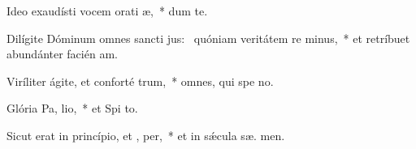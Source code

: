 \item Ideo exaudísti vocem orati æ,~* dum   te.
\item Dilígite Dóminum omnes sancti jus:~\pscross{} quóniam veritátem re minus,~* et retríbuet abundánter facién am.
\item Viríliter ágite, et conforté  trum,~* omnes, qui spe  no.
\item Glória Pa,  lio,~* et Spi to.
\item Sicut erat in princípio, et ,  per,~* et in sǽcula sæ. men.
